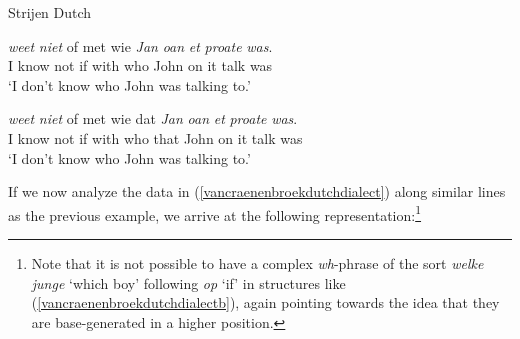 \begin{exe}
\ex Strijen Dutch \citep[45--46]{van2012you}\label{vancraenenbroekdutchdialect}\begin{xlist}
\ex {} {\textit{weet}} {\textit{niet}} {of} {met} {wie} {\textit{Jan}} {\textit{oan}} {\textit{et}} {\textit{proate}} {\textit{was}}.  \\
{I} {know} {not} {if} {with} {who} {John} {on} {it} {talk} {was} \\
\trans `I don't know who John was talking to.'  \label{vancraenenbroekdutchdialecta}

\ex {} {\textit{weet}} {\textit{niet}} {of} {met} {wie} {dat} {\textit{Jan}} {\textit{oan}} {\textit{et}} {\textit{proate}} {\textit{was}}.  \\
{I} {know} {not} {if} {with} {who} {that} {John} {on} {it} {talk} {was} \\
\trans `I don't know who John was talking to.'  \label{vancraenenbroekdutchdialectb}
\end{xlist}
\end{exe}

\noindent If we now analyze the data in (\ref{vancraenenbroekdutchdialect}) along similar lines as the previous example, we arrive at the following representation:\footnote{ Note that it is not possible to have a complex \textit{wh}-phrase of the sort \textit{welke junge} `which boy' following \textit{op} `if' in structures like (\ref{vancraenenbroekdutchdialectb}), again pointing towards the idea that they are base-generated in a higher position.}

\begin{exe}
\ex\label{ex:vancaenenbroekoneb} 
\begin{adjustbox}{width=\linewidth}
\end{adjustbox}
\end{exe}

